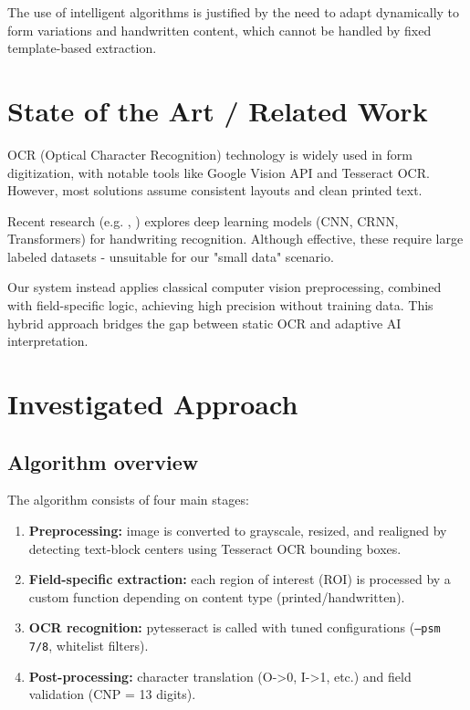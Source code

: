 \documentclass[runningheads,a4paper,11pt]{report}
\begin{document}
The use of intelligent algorithms is justified by the need to adapt dynamically to form variations and handwritten content, which cannot be handled by fixed template-based extraction.

\chapter{State of the Art / Related Work}
\label{chapter:stateOfArt}

OCR (Optical Character Recognition) technology is widely used in form digitization, with notable tools like Google Vision API and Tesseract OCR. However, most solutions assume consistent layouts and clean printed text.

Recent research (e.g. \cite{Koh06}, \cite{Storn95}) explores deep learning models (CNN, CRNN, Transformers) for handwriting recognition. Although effective, these require large labeled datasets - unsuitable for our "small data" scenario.

Our system instead applies classical computer vision preprocessing, combined with field-specific logic, achieving high precision without training data. This hybrid approach bridges the gap between static OCR and adaptive AI interpretation.

\chapter{Investigated Approach}
\label{chapter:proposedApproach}

\section{Algorithm overview}
The algorithm consists of four main stages:
\begin{enumerate}
\item \textbf{Preprocessing:} image is converted to grayscale, resized, and realigned by detecting text-block centers using Tesseract OCR bounding boxes.
\item \textbf{Field-specific extraction:} each region of interest (ROI) is processed by a custom function depending on content type (printed/handwritten).
\item \textbf{OCR recognition:} pytesseract is called with tuned configurations (\texttt{--psm 7/8}, whitelist filters).
\item \textbf{Post-processing:} character translation (O->0, I->1, etc.) and field validation (CNP = 13 digits).
\end{enumerate}
\end{document}

